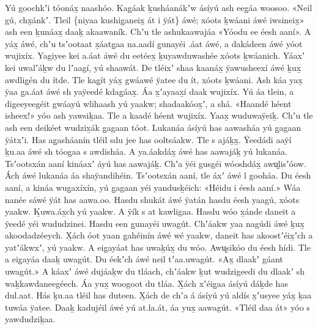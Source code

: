 \begin{pairs}
\begin{Leftside}
Yú goochkʼi tóonáx̱ naashóo.
Kag̱áak ḵusháanákʼw ásíyú ash eeg̱áa woo\-soo.
«\!Neil gú, chx̱ánkʼ.
Tleil \{niyaa kushi\-g̱aneix̱ át i ÿát\} áwé;
xóots ḵwáani áwé iwsineix̱\!»
ash een ḵunáax̱ daaḵ akaawaník.
Chʼu tle ashukaawajáa «\!Yóodu ee éesh aa\-ní\!».
A yáx̱ áwé, chʼu tsʼootaat x̱áatg̱aa na\-.aadí g̱unayéi .áat áwé,
a dakádeen áwé yóot wujixíx.
Yagiyee kei a.áat áwé du eetéex̱ ḵuyawduwashée xóots ḵwáanich.
Yáaxʼ kei uwalʼáḵw du lʼaagí, yú shaawát.
De tléixʼ shaa kaanáx̱ ÿawusheexí áwé ḵux̱ awdlig̱én du ítde.
Tle kag̱ít yáx̱ gwáawé ÿatee du ít, xóots ḵwáani.
Ash káa yax̱ ÿaa g̱a.áat áwé sh yaÿeedé kdag̱áax̱.
Áa x̱ʼayaax̱í daak wujixíx.
Yú áa tlein, a digeeyeegéit gwáayú wlihaash yú yaakw; shadaakóox̱ʼ, a shá.
«\!Haandé héent isheex!\!» yóo ash yawsiḵaa.
Tle a kaa\-dé héent wujixíx.
Yaax̱ wuduwaÿeiḵ.
Chʼu tle ash een deikéet wudzix̱ák g̱agaan tóot.
\pend
\pstart
{}Lukanáa ásíyú has aawasháa yú g̱agaan ÿátxʼi.
Has ag̱asháanín tléil sdu jee has ool\-tsáakw.
Tle s ajáḵx̱.
Ÿeedádi aaÿí ḵu.aa áwé sh tóog̱aa s awdisháa.
A ya.áakdáx̱ áwé has aawajáḵ yú lukanáa.
Tsʼootsxán aaní kináaxʼ áyú has aawajáḵ.
Chʼa ÿéi gusgéi wóoshdáx̱ awu̬lisʼóow.
Ách áwé lukanáa áa shaÿandihéin.
Tsʼootsxán aaní, tle áxʼ áwé l gooháa.
Du éesh aaní, a kináa wug̱axíxín, yú g̱agaan yéi yandusḵéich:
«\!Héidu i éesh aaní.\!»
Wáa nanée sáwé ÿát has aawa.oo.
Hasdu shukát áwé ÿatán hasdu éesh yaagú, xóots yaakw.
Ḵuwa.áx̱ch yú yaakw.
A ÿík s at kawligaa.
Hasdu wóo x̱ánde daneit a ÿeedé yéi wududzinei.
Hasdu een g̱una\-yéi uwagút.
Chʼáakw yaa nagúdi áwé ḵux̱ akoodadzéeych.
X̱ách óot yaan g̱ahéinín áwé wé yaakw, daneit has akoostʼéix̱ʼch a yatʼákwxʼ, yú yaakw.
\pend
\pstart
{}A eig̱ayáat has uwaḵúx̱ du wóo.
Awu̬si\-kóo du éesh hídi.
Tle a eig̱ayáa daaḵ uwagút.
Du éekʼch áwé neil tʼaa.uwagút.
«\!Ax̱ dlaakʼ gáant uwagút.\!»
A káaxʼ áwé dujáaḵw du tláach, chʼáakw ḵut wudzigeedi du dlaakʼ sh waḵkawdaneegéech.
Áa yux̱ woogoot du tláa.
X̱ách xʼéig̱aa ásíyú dáḵde has dul.aat.
Hás ḵu.aa tléil has duteen.
X̱ách de chʼa á ásíyú yú aldís x̱ʼusyee yáx̱ ḵaa tuwáa ÿatee. 
Daaḵ kadujéil áwé yú at.la.át, áa yux̱ aawagút.
«\!Tléil daa át\!» yóo s yawdudzi\-ḵaa.

\end{Leftside}
\end{pairs}
